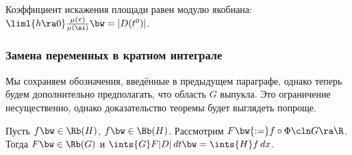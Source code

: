 \documentclass[a4paper]{article}
\begin{document}
\begin{imp}
Коэффициент искажения площади равен модулю якобиана: $\liml{h\ra 0} \frac{\mu(\tau)}{\mu(\si)} \bw= |D(t^0)|$.
\end{imp}

\subsubsection{Замена переменных в кратном интеграле}

Мы сохраняем обозначения, введённые в предыдущем параграфе, однако теперь будем дополнительно
предполагать, что область $G$ выпукла. Это ограничение несущественно, однако доказательство теоремы
будет выглядеть попроще.
\begin{theorem}
Пусть $f \bw\in \Rb(H)$, $f \bw\in \Bb(H)$. Рассмотрим $F \bw{:=} f \circ \Phi\cln G \ra \R$. Тогда $F \bw\in
\Rb(G)$ и $\ints{G}F|D|\,dt \bw= \ints{H} f\,dx$.
\end{theorem}
\end{document}
